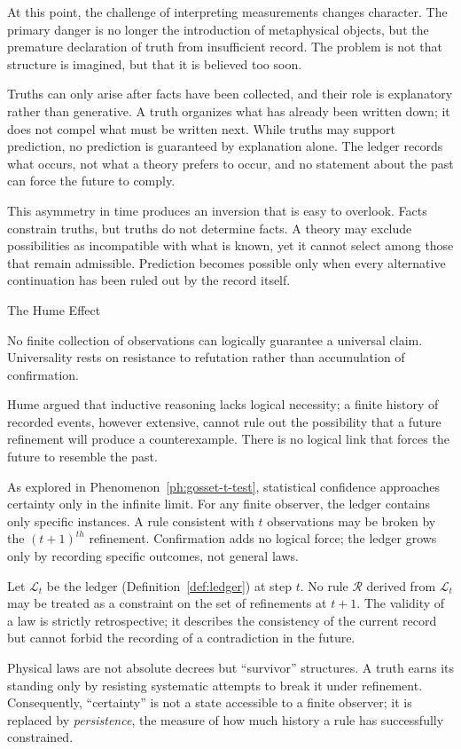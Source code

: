 At this point, the challenge of interpreting measurements changes character.
The primary danger is no longer the introduction of metaphysical objects, but
the premature declaration of truth from insufficient record. The problem is not
that structure is imagined, but that it is believed too soon.

Truths can only arise after facts have been collected, and their role is
explanatory rather than generative. A truth organizes what has already been
written down; it does not compel what must be written next. While truths may
support prediction, no prediction is guaranteed by explanation alone. The
ledger records what occurs, not what a theory prefers to occur, and no
statement about the past can force the future to comply.

This asymmetry in time produces an inversion that is easy to overlook. Facts
constrain truths, but truths do not determine facts. A theory may exclude
possibilities as incompatible with what is known, yet it cannot select among
those that remain admissible. Prediction becomes possible only when every
alternative continuation has been ruled out by the record itself.

\begin{phenom}{The Hume Effect~\cite{hume1748}}
\label{ph:truth-effect}

\PhStatement
No finite collection of observations can logically guarantee a universal claim.
Universality rests on resistance to refutation rather than accumulation of
confirmation.

\PhOrigin
Hume argued that inductive reasoning lacks logical necessity; a finite history
of recorded events, however extensive, cannot rule out the possibility that
a future refinement will produce a counterexample. There is no logical link
that forces the future to resemble the past.

\PhObservation
As explored in Phenomenon~\ref{ph:gosset-t-test},
statistical confidence approaches certainty only in the infinite limit. For
any finite observer, the ledger contains only specific instances. A rule
consistent with $t$ observations may be broken by the $(t+1)^{th}$ refinement.
Confirmation adds no logical force; the ledger grows only by recording specific
outcomes, not general laws.

\PhConstraint
Let $\mathcal{L}_t$ be the ledger (Definition~\ref{def:ledger}) at step $t$. 
No rule $\mathcal{R}$ derived from $\mathcal{L}_t$ may be treated as a constraint on the set of 
refinements at $t+1$. The validity of a law is strictly retrospective; it
describes the consistency of the current record but cannot forbid the recording
of a contradiction in the future.

\PhConsequence
Physical laws are not absolute decrees but ``survivor'' structures. A truth
earns its standing only by resisting systematic attempts to break it under
refinement. Consequently, ``certainty'' is not a state accessible to a finite
observer; it is replaced by \emph{persistence}, the measure of how much
history a rule has successfully constrained.  
\end{phenom}


